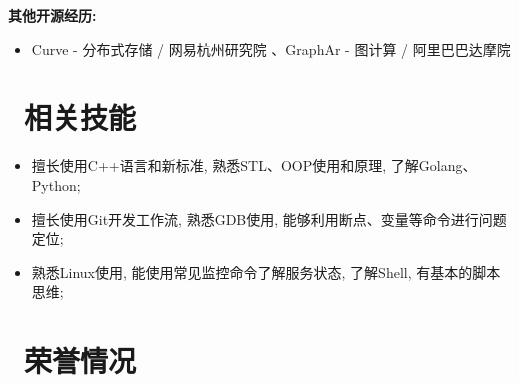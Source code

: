 \documentclass{resume}
\begin{document}
\textbf{其他开源经历:}
\begin{itemize}
  \item Curve - 分布式存储 / 网易杭州研究院 、GraphAr - 图计算 / 阿里巴巴达摩院 
\end{itemize}

\section{\faCogs\ 相关技能}
\begin{itemize}
  \item 擅长使用C++语言和新标准, 熟悉STL、OOP使用和原理, 了解Golang、Python;
  \item 擅长使用Git开发工作流, 熟悉GDB使用, 能够利用断点、变量等命令进行问题定位;
  \item 熟悉Linux使用, 能使用常见监控命令了解服务状态, 了解Shell, 有基本的脚本思维;
\end{itemize}

\section{\faHeartO\ 荣誉情况}
\end{document}
